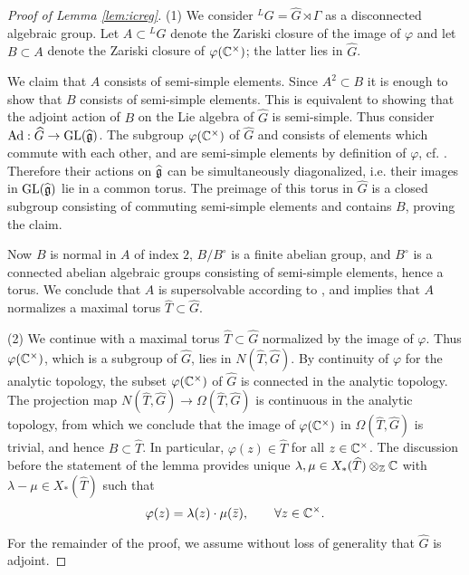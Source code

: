 \documentclass{article}
\theoremstyle{definition}
\numberwithin{equation}{section}
\renewcommand{\-}{\hyp{}}
\begin{document}
\begin{proof}[Proof of Lemma \ref{lem:icreg}]
(1) We consider $^LG = \hat G \rtimes \Gamma$ as a disconnected algebraic group. Let $A \subset {^LG}$ denote the Zariski closure of the image of $\varphi$ and let $B \subset A$ denote the Zariski closure of $\varphi(\mathbb{C}^\times)$; the latter lies in $\hat G$. 

We claim that $A$ consists of semi-simple elements. Since $A^2 \subset B$ it is enough to show that $B$ consists of semi-simple elements. This is equivalent to showing that the adjoint action of $B$ on the Lie algebra of $\hat G$ is semi-simple. Thus consider $\textrm{Ad} : \widehat G \to \textrm{GL}(\mathfrak{\widehat g})$. The subgroup $\varphi(\mathbb{C}^\times)$ of $\hat G$ and consists of elements which commute with each other, and are semi-simple elements by definition of $\varphi$, cf. \cite[\S8]{BorCor}. Therefore their actions on $\mathfrak{\widehat g}$ can be simultaneously diagonalized, i.e. their images in $\textrm{GL}(\mathfrak{\widehat g})$ lie in a common torus. The preimage of this torus in $\hat G$ is a closed subgroup consisting of commuting semi-simple elements and contains $B$, proving the claim.

Now $B$ is normal in $A$ of index $2$, $B/B^\circ$ is a finite abelian group, and $B^\circ$ is a connected abelian algebraic groups consisting of semi-simple elements, hence a torus. We conclude that $A$ is supersolvable according to \cite[Definition 5.14]{SS70}, and \cite[Theorem 5.16]{SS70} implies that $A$ normalizes a maximal torus $\hat T \subset \hat G$. 

(2) We continue with a maximal torus $\hat T \subset \hat G$ normalized by the image of $\varphi$. Thus $\varphi(\mathbb{C}^\times)$, which is a subgroup of $\hat G$, lies in $N(\hat T,\hat G)$. By continuity of $\varphi$ for the analytic topology, the subset $\varphi(\mathbb{C}^\times)$ of $\hat G$ is connected in the analytic topology. The projection map $N(\hat T,\hat G) \to \Omega(\hat T,\hat G)$ is continuous in the analytic topology, from which we conclude that the image of $\varphi(\mathbb{C}^\times)$ in $\Omega(\hat T,\hat G)$ is trivial, and hence $B \subset \hat T$. In particular, $\varphi(z) \in \hat T$ for all $z \in \mathbb{C}^\times$. The discussion before the statement of the lemma provides unique $\lambda,\mu \in X_*(\widehat T)\otimes_{\mathbb{Z}}\mathbb{C}$ with $\lambda-\mu \in X_*(\hat T)$ such that
\[ \varphi(z) = \lambda(z) \cdot \mu(\bar z),\qquad \forall z \in \mathbb{C}^\times. \]

For the remainder of the proof, we assume without loss of generality that $\hat G$ is adjoint.


\end{proof}
\end{document}
